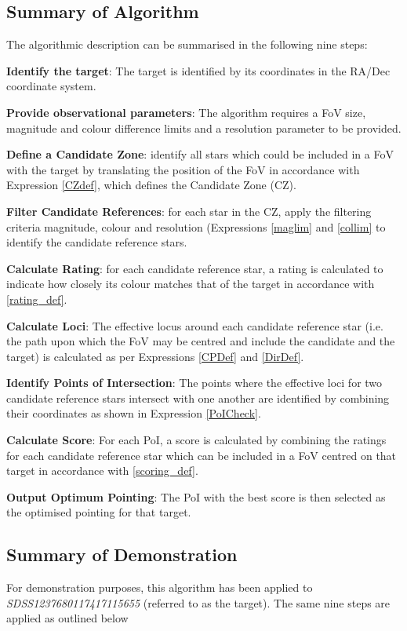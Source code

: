 \documentclass{aa}
\begin{document}
\subsection{Summary of Algorithm}
The algorithmic description can be summarised in the following nine steps:

\textbf{Identify the target}: The target is identified by its coordinates in the RA/Dec coordinate system.

\textbf{Provide observational parameters}: The algorithm requires a FoV size, magnitude and colour difference limits and a resolution parameter to be provided.

\textbf{Define a Candidate Zone}: identify all stars which could be included in a FoV with the target by translating the position of the FoV in accordance with Expression \ref{CZdef}, which defines the Candidate Zone (CZ).

\textbf{Filter Candidate References}: for each star in the CZ, apply the filtering criteria magnitude, colour and resolution (Expressions \ref{maglim} and \ref{collim} to identify the candidate reference stars.

\textbf{Calculate Rating}: for each candidate reference star, a rating is calculated to indicate how closely its colour matches that of the target in accordance with \ref{rating_def}.

\textbf{Calculate Loci}: The effective locus around each candidate reference star (i.e. the path upon which the FoV may be centred and include the candidate and the target) is calculated as per Expressions \ref{CPDef} and \ref{DirDef}.

\textbf{Identify Points of Intersection}: The points where the effective loci for two candidate reference stars intersect with one another are identified by combining their coordinates as shown in Expression \ref{PoICheck}.

\textbf{Calculate Score}: For each PoI, a score is calculated by combining the ratings for each candidate reference star which can be included in a FoV centred on that target in accordance with \ref{scoring_def}.

\textbf{Output Optimum Pointing}: The PoI with the best score is then selected as the optimised pointing for that target.

\subsection{Summary of Demonstration}
For demonstration purposes, this algorithm has been applied to \textit{SDSS1237680117417115655} (referred to as the target). The same nine steps are applied as outlined below
\end{document}

